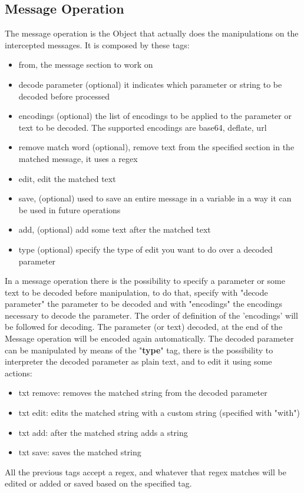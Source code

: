 \subsection{Message Operation}
The message operation is the Object that actually does the manipulations on the intercepted messages. It is composed by these tags:
\begin{itemize}
    \item from, the message section to work on
    \item decode parameter (optional) it indicates which parameter or string to be decoded before processed
    \item encodings (optional) the list of encodings to be applied to the parameter or text to be decoded. The supported encodings are base64, deflate, url
    \item remove match word (optional), remove text from the specified section in the matched message, it uses a regex
    \item edit, edit the matched text
    \item save, (optional) used to save an entire message in a variable in a way it can be used in future operations
    \item add, (optional) add some text after the matched text
    \item type (optional) specify the type of edit you want to do over a decoded parameter
\end{itemize}

In a message operation there is the possibility to specify a parameter or some text to be decoded before manipulation, to do that, specify with "decode parameter" the parameter to be decoded and with "encodings" the encodings necessary to decode the parameter. The order of definition of the 'encodings' will be followed for decoding. The parameter (or text) decoded, at the end of the Message operation will be encoded again automatically.
The decoded parameter can be manipulated by means of the "\textbf{type}" tag, there is the possibility to interpreter the decoded parameter as plain text, and to edit it using some actions:
\begin{itemize}
    \item txt remove: removes the matched string from the decoded parameter
    \item txt edit: edits the matched string with a custom string (specified with "with")
    \item txt add: after the matched string adds a string
    \item txt save: saves the matched string
\end{itemize}
All the previous tags accept a regex, and whatever that regex matches will be edited or added or saved based on the specified tag.

